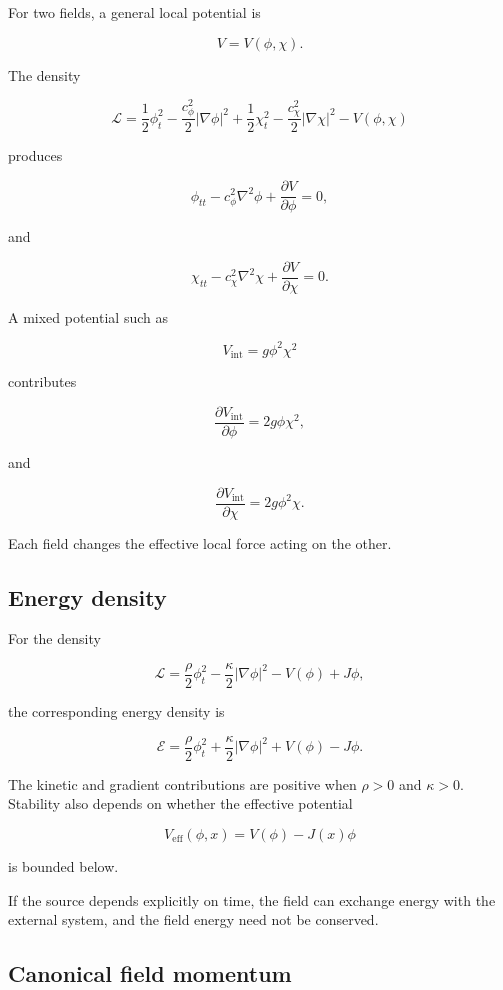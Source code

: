For two fields, a general local potential is

\[
V=V(\phi,\chi).
\]

The density

\[
\mathcal{L}
=
\frac{1}{2}\phi_{t}^{2}
-
\frac{c_{\phi}^{2}}{2}|\nabla\phi|^{2}
+
\frac{1}{2}\chi_{t}^{2}
-
\frac{c_{\chi}^{2}}{2}|\nabla\chi|^{2}
-
V(\phi,\chi)
\]

produces

\[
\boxed{
\phi_{tt}
-
c_{\phi}^{2}\nabla^{2}\phi
+
\frac{\partial V}{\partial\phi}
=0
},
\]

and

\[
\boxed{
\chi_{tt}
-
c_{\chi}^{2}\nabla^{2}\chi
+
\frac{\partial V}{\partial\chi}
=0
}.
\]

A mixed potential such as

\[
V_{\mathrm{int}}
=
g\phi^{2}\chi^{2}
\]

contributes

\[
\frac{\partial V_{\mathrm{int}}}{\partial\phi}
=
2g\phi\chi^{2},
\]

and

\[
\frac{\partial V_{\mathrm{int}}}{\partial\chi}
=
2g\phi^{2}\chi.
\]

Each field changes the effective local force acting on the other.

\subsection{Energy density}

For the density

\[
\mathcal{L}
=
\frac{\rho}{2}\phi_{t}^{2}
-
\frac{\kappa}{2}|\nabla\phi|^{2}
-
V(\phi)
+
J\phi,
\]

the corresponding energy density is

\[
\boxed{
\mathcal{E}
=
\frac{\rho}{2}\phi_{t}^{2}
+
\frac{\kappa}{2}|\nabla\phi|^{2}
+
V(\phi)
-
J\phi
}.
\]

The kinetic and gradient contributions are positive when \(\rho>0\) and \(\kappa>0\). Stability also depends on whether the effective potential

\[
V_{\mathrm{eff}}(\phi,x)
=
V(\phi)-J(x)\phi
\]

is bounded below.

If the source depends explicitly on time, the field can exchange energy with the external system, and the field energy need not be conserved.

\subsection{Canonical field momentum}

